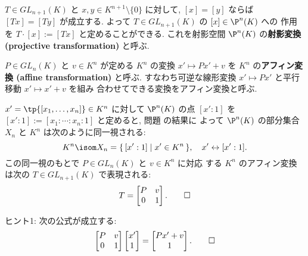\documentclass[12pt,twoside]{jarticle}
\begin{document}
\begin{question}[射影変換とアフィン変換]
\label{q:proj-aff-transf}
  $T\in GL_{n+1}(K)$ と $x,y\in K^{n+1}\setminus\{0\}$ に対して, 
  $[x]=[y]$ ならば $[Tx]=[Ty]$ が成立する.
  よって $T\in GL_{n+1}(K)$ の $[x]\in\P^n(K)$ への
  作用を $T\cdot[x] := [Tx]$ と定めることができる. 
  これを射影空間 $\P^n(K)$ の{\bf 射影変換 (projective transformation)} と呼ぶ.

  $P\in GL_n(K)$ と $v\in K^n$ が定める $K^n$ の変換 $x'\mapsto Px'+v$ 
  を $K^n$ の{\bf アフィン変換 (affine transformation)} と呼ぶ.
  すなわち可逆な線形変換 $x'\mapsto Px'$ と平行移動 $x'\mapsto x'+v$ を組み
  合わせてできる変換をアフィン変換と呼ぶ.

  $x'=\tp{[x_1,\dots,x_n]}\in K^n$ に対して $\P^n(K)$ の点 $[x':1]$
  を $[x':1]:=[x_1:\cdots:x_n:1]$ と定めると,
  問題  の結果に
  よって $\P^n(K)$ の部分集合 $X_n$ と $K^n$ は次のように同一視される:
  \begin{equation*}
    K^n \isom X_n=\{\,[x':1]\mid x'\in K^n\,\},
    \quad
    x' \leftrightarrow [x':1].
  \end{equation*}
  この同一視のもとで $P\in GL_n(K)$ と $v\in K^n$ に対応
  する $K^n$ のアフィン変換は次の $T\in GL_{n+1}(K)$ で表現される:
  \begin{equation*}
    T = 
    \begin{bmatrix}
      P & v \\
      0 & 1 \\
    \end{bmatrix}.
    \qed
  \end{equation*}
\end{question}

\noindent
ヒント1: 次の公式が成立する:
\begin{equation*}
  \begin{bmatrix}
    P & v \\
    0 & 1 \\
  \end{bmatrix}
  \begin{bmatrix}
    x' \\
    1 \\
  \end{bmatrix}
  =
  \begin{bmatrix}
    Px' + v \\
       1 \\
  \end{bmatrix}.
  \qed
\end{equation*}
\end{document}
